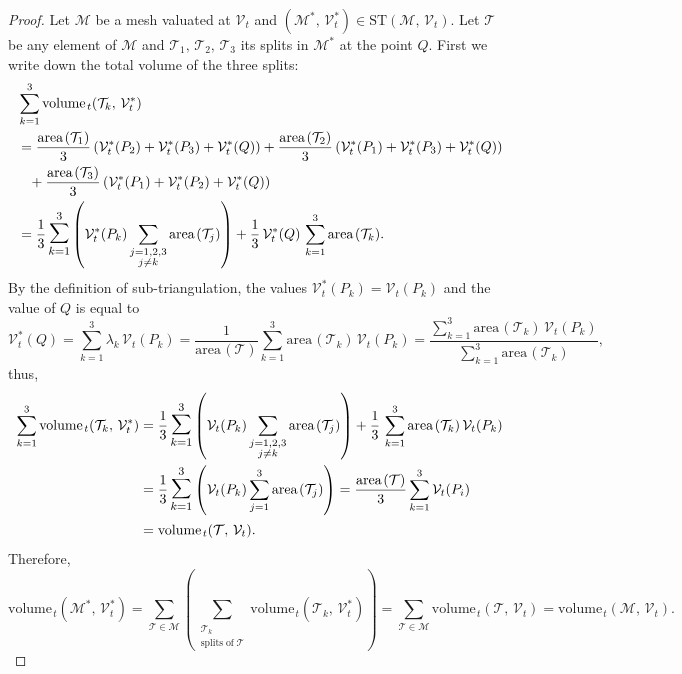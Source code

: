 \documentclass{article}
\theoremstyle{definition}
\newcommand{\MM}{\mathcal{M}}
\newcommand{\VV}{\mathcal{V}}
\newcommand{\TT}{\mathcal{T}}
\newcommand{\area}{\mathrm{area}\hspace{1pt}}
\newcommand{\vol}{\mathrm{volume\hspace{1pt}}}
\newcommand{\ST}{\mathrm{ST}}
\begin{document}
\begin{proof}[Proof]
Let $\MM$ be a mesh valuated at $\VV_t$ and $(\MM^*,\,\VV_t^*) \in \ST(\MM,\,\VV_t)$. Let $\TT$ be any element of $\MM$ and $\TT_1,\,\TT_2,\,\TT_3$ its splits in $\MM^*$ at the point $Q$.
First we write down the total volume of the three splits:
\begin{align*}
& \sum_{k=1}^3\vol_t(\TT_k,\,\VV_t^*)\\ & =
   \frac{\area(\TT_1)}{3}\left(\VV_t^*(P_2)+ \VV_t^*(P_3) + \VV_t^*(Q)
\right)
 +  \frac{\area(\TT_2)}{3}\left(\VV_t^*(P_1) + \VV_t^*(P_3)+ \VV_t^*(Q)
\right)\\ &
\hspace{8pt} +  \frac{\area(\TT_3)}{3}\left(\VV_t^*(P_1)+ \VV_t^*(P_2) + \VV_t^*(Q)
\right) \\ & =
\frac{1}{3}\,\mathlarger{\mathlarger{\sum}}_{k=1}^3\left(\VV_t^*(P_k)\sum_{\substack{j=1,2,3 \\ j\neq k}}\area(\TT_j)\right) + \frac{1}{3}\,\VV_t^*(Q)\,\sum_{k=1}^3\area(\TT_k).
\end{align*}
By the definition of sub-triangulation, the values $\VV_t^*(P_k) = \VV_t(P_k)$ and the value of $Q$ is equal to \[\VV_t^*(Q) = \sum_{k=1}^3\lambda_k\,\VV_t(P_k) = \frac{1}{\area(\TT)}\sum_{k=1}^3\area(\TT_k)\,\VV_t(P_k)
=  \frac{\sum_{k=1}^3\area(\TT_k)\,\VV_t(P_k)}{\sum_{k=1}^3\area(\TT_k)},\]
thus,
\begin{align*}\sum_{k=1}^3\vol_t(\TT_k,\,\VV_t^*) & =
\frac{1}{3}\,\mathlarger{\mathlarger{\sum}}_{k=1}^3\left(\VV_t(P_k)\sum_{\substack{j=1,2,3 \\ j\neq k}}\area(\TT_j)\right)
+ \frac{1}{3}\,\sum_{k=1}^3\area(\TT_k)\,\VV_t(P_k)
\\ & = \frac{1}{3}\,\mathlarger{\mathlarger{\sum}}_{k=1}^3\left(\VV_t(P_k)\sum_{j=1}^3\area(\TT_j)\right)
= \frac{\area(\TT)}{3} \sum_{k=1}^3 \VV_t(P_i) \\ & = \vol_t(\TT,\,\VV_t) .
\end{align*}
Therefore,
\[\vol_t(\MM^*,\,\VV_t^*) = \sum_{\TT\in\MM}\left(\sum_{\substack{\TT_k\\ \mathrm{splits\;of\;} \TT}} \vol_t(\TT_k,\,\VV_t^*)\right) = \sum_{\TT\in\MM} \vol_t(\TT,\,\VV_t) = \vol_t(\MM,\,\VV_t).\]
\end{proof}
\end{document}
